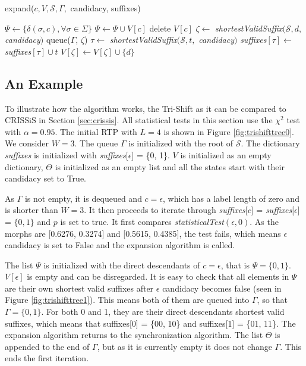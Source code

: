 {  \begin{algorithm}[t]
  \caption{expand($c, V, \mathcal{S},\Gamma,$ candidacy, suffixes)\label{alg:expand}}
    \begin{algorithmic}[1]
      	\State $\Psi \gets \{\delta(\sigma,c),\forall \sigma \in \Sigma\}$
      		\State $\Psi \gets \Psi \cup V[c]$
      		\State delete $V[c]$
      	\EndIf
      		\State $\zeta \gets $ \textit{shortestValidSuffix}$(\mathcal{S}, d,$ \textit{candidacy}$)$
      			\State queue($\Gamma$, $\zeta$)
      				\State $\tau \gets $ \textit{shortestValidSuffix}$(\mathcal{S}, t,$ \textit{candidacy}$)$
      				\State \textit{suffixes}$[\tau] \gets$ \textit{suffixes}$[\tau] \cup t$
      			\EndFor
      		\Else
      			\State $V[\zeta] \gets V[\zeta]\cup\{d\}$
      		\EndIf
      	\EndFor
      \EndProcedure
    \end{algorithmic}
  \end{algorithm}

\subsection{An Example}

To illustrate how the algorithm works, the Tri-Shift as it can be compared to CRISSiS in Section \ref{sec:crissis}. All statistical tests in this section use the $\chi^2$ test with $\alpha = 0.95$. The initial RTP with $L = 4$ is shown in Figure \ref{fig:trishifttree0}. We consider $W=3$.  The queue $\Gamma$ is initialized with the root of $\mathcal{S}$. The dictionary \textit{suffixes} is initialized with  \textit{suffixes}[$\epsilon$] = \{0, 1\}. $V$ is initialized as an empty dictionary, $\Theta$ is initialized as an empty list and all the states start with their candidacy set to True.

As $\Gamma$ is not empty, it is dequeued and $c = \epsilon$, which has a label length of zero and is shorter than $W = 3$. It then proceeds to iterate through \textit{suffixes}[$c$] = \textit{suffixes}[$\epsilon$] = $\{0, 1\}$ and $p$ is set to true. It first compares \textit{statisticalTest}$(\epsilon, 0)$. As the morphs are [0.6276, 0.3274] and [0.5615, 0.4385], the test fails, which means $\epsilon$ candidacy is set to False and the expansion algorithm is called. 

The list $\Psi$ is initialized with the direct descendants of $c = \epsilon$, that is $\Psi = \{0, 1\}$. $V[\epsilon]$ is empty and can be disregarded. It is easy to check that all elements in $\Psi$ are their own shortest valid suffixes after $\epsilon$ candidacy becomes false (seen in Figure \ref{fig:trishifttree1}). This means both of them are queued into $\Gamma$, so that $\Gamma = \{0, 1\}$. For both 0 and 1, they are their direct descendants shortest valid suffixes, which means that suffixes[0] = \{00, 10\} and suffixes[1] = \{01, 11\}. The expansion algorithm returns to the synchronization algorithm. The list $\Theta$ is appended to the end of $\Gamma$, but as it is currently empty it does not change $\Gamma$. This ends the first iteration. 

}
